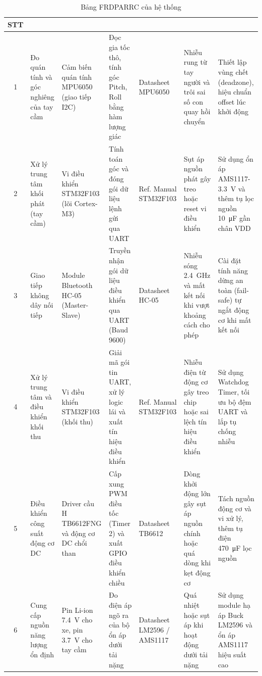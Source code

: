 \begin{table}[H]
\centering
\renewcommand{\arraystretch}{1.3}
\caption{Bảng FRDPARRC của hệ thống}
\label{tab:frdparrc}
\changefontsizes{9pt}
\begin{tabularx}{0.98\textwidth}{|c|>{\raggedright\arraybackslash}X|>{\raggedright\arraybackslash}p{2.1cm}|>{\raggedright\arraybackslash}p{2.1cm}|>{\raggedright\arraybackslash}p{1.8cm}|>{\raggedright\arraybackslash}p{2.1cm}|>{\raggedright\arraybackslash}p{2.3cm}|}
\hline
\multicolumn{1}{|c|}{\textbf{STT}} & \multicolumn{1}{c|}{\textbf{FR}} & \multicolumn{1}{c|}{\textbf{DP}} & \multicolumn{1}{c|}{\textbf{A}} & \multicolumn{1}{c|}{\textbf{R}} & \multicolumn{1}{c|}{\textbf{R}} & \multicolumn{1}{c|}{\textbf{C}} \\
\hline
1 & Đo quán tính và góc nghiêng của tay cầm & Cảm biến quán tính MPU6050 (giao tiếp I2C) & Đọc gia tốc thô, tính góc Pitch, Roll bằng hàm lượng giác & Datasheet MPU6050 \cite{mpu6050-datasheet} & Nhiễu rung từ tay người và trôi sai số con quay hồi chuyển & Thiết lập vùng chết (deadzone), hiệu chuẩn offset lúc khởi động \\
\hline
2 & Xử lý trung tâm khối phát (tay cầm) & Vi điều khiển STM32\-F103 (lõi Cortex-M3) & Tính toán góc và đóng gói dữ liệu lệnh gửi qua UART & Ref. Manual STM32F103 \cite{stm32-hal} & Sụt áp nguồn phát gây treo hoặc reset vi điều khiển & Sử dụng ổn áp AMS1117-\qty{3.3}{\volt} và thêm tụ lọc nguồn \qty{10}{\micro\farad} gần chân VDD \\
\hline
3 & Giao tiếp không dây nối tiếp & Module Bluetooth HC-05 (Master-Slave) & Truyền nhận gói dữ liệu điều khiển qua UART (Baud \num{9600}) & Datasheet HC-05 & Nhiễu sóng \qty{2.4}{\giga\hertz} và mất kết nối khi vượt khoảng cách cho phép & Cài đặt tính năng dừng an toàn (fail-safe) tự ngắt động cơ khi mất kết nối \\
\hline
4 & Xử lý trung tâm và điều khiển khối thu & Vi điều khiển STM32\-F103 (khối thu) & Giải mã gói tin UART, xử lý logic lái và xuất tín hiệu điều khiển & Ref. Manual STM32F103 \cite{stm32-hal} & Nhiễu điện từ động cơ gây treo chip hoặc sai lệch tín hiệu điều khiển & Sử dụng Watchdog Timer, tối ưu bộ đệm UART và lắp tụ chống nhiễu \\
\hline
5 & Điều khiển công suất động cơ DC & Driver cầu H TB6612FNG và động cơ DC chổi than & Cấp xung PWM điều tốc (Timer 2) và xuất GPIO điều khiển chiều & Datasheet TB6612 & Dòng khởi động lớn gây sụt áp nguồn chính hoặc quá dòng khi kẹt động cơ & Tách nguồn động cơ và vi xử lý, thêm tụ điện \qty{470}{\micro\farad} lọc nguồn \\
\hline
6 & Cung cấp nguồn năng lượng ổn định & Pin Li-ion \qty{7.4}{\volt} cho xe, pin \qty{3.7}{\volt} cho tay cầm & Đo điện áp ngõ ra của bộ ổn áp dưới tải nặng & Datasheet LM2596 / AMS1117 & Quá nhiệt hoặc sụt áp khi hoạt động dưới tải nặng & Sử dụng module hạ áp Buck LM2596 và ổn áp AMS1117 hiệu suất cao \\
\hline
\end{tabularx}
\end{table}

